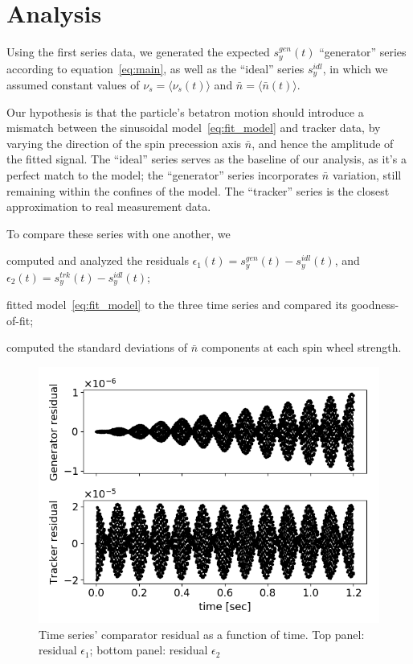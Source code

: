 \documentclass[a4paper]{jacow}
\newcommand{\avg}[1]{\langle {#1} \rangle}
\newcommand{\nbar}{\bar n}
\begin{document}
\section{Analysis}
Using the first series data, we generated the expected $s_y^{gen}(t)$ ``generator'' series according to
equation~\eqref{eq:main}, as well as the ``ideal'' series $s_y^{idl}$, in which
we assumed constant values of $\nu_s = \avg{\nu_s(t)}$ and $\nbar
=\avg{\nbar(t)}$. 

Our hypothesis is that the particle's betatron
motion should introduce a mismatch between the sinusoidal
model~\eqref{eq:fit_model} and tracker data, by varying the direction
of the spin precession axis $\nbar$, and hence the amplitude of the
fitted signal. The ``ideal'' series serves as the baseline of our
analysis, as it's a perfect match to the model; the ``generator''
series incorporates $\nbar$ variation, still remaining within the confines of
the model. The ``tracker'' series is the closest approximation to
real measurement data.

To compare these series with one another, we
\begin{inparaenum}
\item computed and analyzed the residuals
  $\epsilon_1(t) = s_y^{gen}(t) - s_y^{idl}(t)$, and
  $\epsilon_2(t) = s_y^{trk}(t) - s_y^{idl}(t)$;
\item fitted model~\eqref{eq:fit_model} to the three time series and
  compared its goodness-of-fit;
\item computed the standard deviations of $\nbar$ components at each
  spin wheel strength.
\end{inparaenum}

\begin{figure}[h]
  \centering
    \includegraphics[width=\linewidth]{../img/IPAC19/residual_vs_time(both)}
  \caption{Time series' comparator residual as a function of time.
    Top panel: residual $\epsilon_1$; bottom panel: residual $\epsilon_2$\label{fig:residuals}}
\end{figure}
\end{document}
